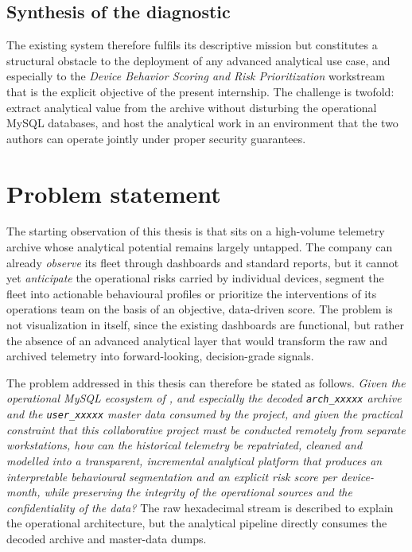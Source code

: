 \subsection{Synthesis of the diagnostic}
The existing system therefore fulfils its descriptive mission but constitutes a structural obstacle to the deployment of any advanced analytical use case, and especially to the \emph{Device Behavior Scoring and Risk Prioritization} workstream that is the explicit objective of the present internship. The challenge is twofold: extract analytical value from the archive without disturbing the operational MySQL databases, and host the analytical work in an environment that the two authors can operate jointly under proper security guarantees.

\section{Problem statement}
The starting observation of this thesis is that \hostorg{} sits on a high-volume telemetry archive whose analytical potential remains largely untapped. The company can already \emph{observe} its fleet through dashboards and standard reports, but it cannot yet \emph{anticipate} the operational risks carried by individual devices, segment the fleet into actionable behavioural profiles or prioritize the interventions of its operations team on the basis of an objective, data-driven score. The problem is not visualization in itself, since the existing dashboards are functional, but rather the absence of an advanced analytical layer that would transform the raw and archived telemetry into forward-looking, decision-grade signals.

The problem addressed in this thesis can therefore be stated as follows. \emph{Given the operational MySQL ecosystem of \hostorg, and especially the decoded \texttt{arch\_xxxxx} archive and the \texttt{user\_xxxxx} master data consumed by the project, and given the practical constraint that this collaborative project must be conducted remotely from separate workstations, how can the historical telemetry be repatriated, cleaned and modelled into a transparent, incremental analytical platform that produces an interpretable behavioural segmentation and an explicit risk score per device-month, while preserving the integrity of the operational sources and the confidentiality of the data?} The raw hexadecimal stream is described to explain the operational architecture, but the analytical pipeline directly consumes the decoded archive and master-data dumps.

